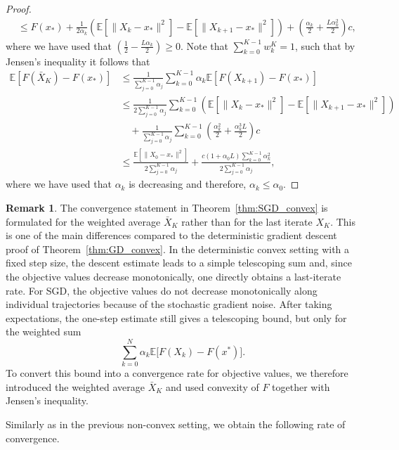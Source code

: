 \documentclass[12pt,openany]{book}
\theoremstyle{definition}
\newtheorem{remark}[thm]{Remark}
\theoremstyle{definition}
\newcommand{\E}{\mathbb{E}}
\begin{document}
\begin{proof}
\begin{align*}
&\le  F(x_\ast) + \frac{1}{2\alpha_k} \left( \E[\|X_k-x_\ast\|^2]-\E[\|X_{k+1}-x_\ast\|^2]\right)+ \left(\frac{\alpha_k}2+\frac{L\alpha_k^2}2\right)c,
\end{align*}
where we have used that $(\frac12-\frac{L\alpha_k}2)\ge0$. Note that $\sum_{k=0}^{K-1} w_k^K = 1$, such that by Jensen's inequality it follows that
\begin{align*}
\E[F(\bar X_K)-F(x_\ast)] &\le \frac{1}{\sum_{j=0}^{K-1}\alpha_j}\sum_{k=0}^{K-1}\alpha_k \E[F(X_{k+1})-F(x_\ast)]\\
&\le \frac{1}{2\sum_{j=0}^{K-1}\alpha_j}\sum_{k=0}^{K-1} \left(\E[\|X_k-x_\ast\|^2]-\E[\|X_{k+1}-x_\ast\|^2] \right)\\
&\quad + \frac{1}{\sum_{j=0}^{K-1}\alpha_j}\sum_{k=0}^{K-1}\left(\frac{\alpha_k^2}{2}+\frac{\alpha_k^3L}{2}\right) c\\
&\le \frac{\E[\|X_0-x_\ast\|^2]}{2\sum_{j=0}^{K-1}\alpha_j} + \frac{c(1+\alpha_0 L)\sum_{k=0}^{K-1} \alpha_k^2}{2\sum_{j=0}^{K-1}\alpha_j},
\end{align*}
where we have used that $\alpha_k$ is decreasing and therefore, $\alpha_k\le\alpha_0$. 
\end{proof}

\begin{remark}
The convergence statement in Theorem~\ref{thm:SGD_convex} is formulated for the weighted average
\(\bar X_K\)
rather than for the last iterate $X_K$. This is one of the main differences compared to the
deterministic gradient descent proof of Theorem~\ref{thm:GD_convex}. In the deterministic convex setting with a
fixed step size, the descent estimate leads to a simple telescoping sum and, since the objective values decrease monotonically, one directly obtains a last-iterate rate. For SGD, the objective values do not decrease monotonically along individual trajectories because of the stochastic gradient noise. After taking expectations, the one-step estimate still gives a telescoping bound, but only for the weighted sum
\[
\sum_{k=0}^N \alpha_k \E\big[F(X_k)-F(x^\ast)\big].
\]
To convert this bound into a convergence rate for objective values, we therefore introduced the weighted average $\bar X_K$ and used convexity of $F$ together with Jensen's inequality.
\end{remark}

Similarly as in the previous non-convex setting, we obtain the following rate of convergence.
\end{document}
